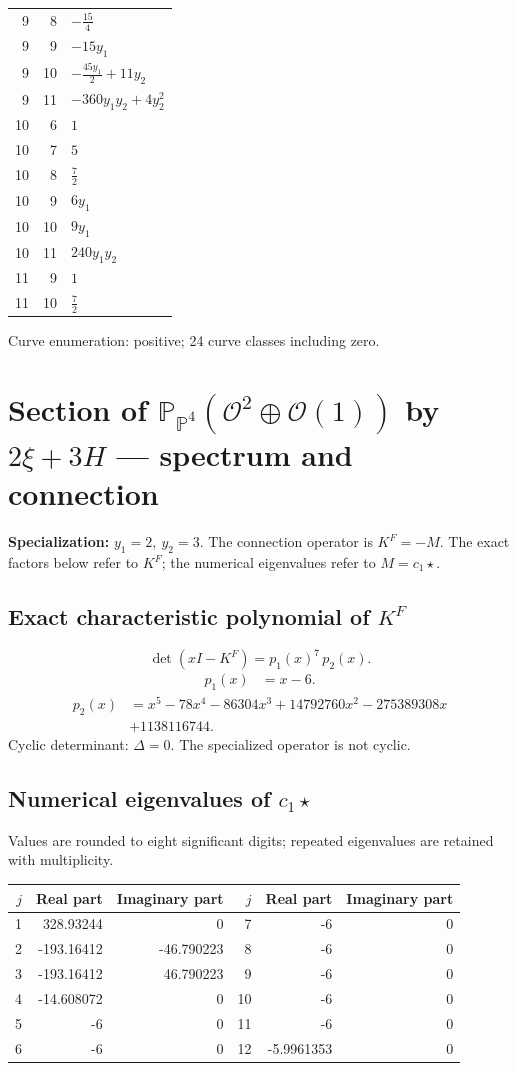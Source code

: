 \documentclass[10pt,a4paper]{article}
\begin{document}
{\begin{longtable}{rrp{125mm}}
9 & 8 & $- \frac{15}{4}$\\
9 & 9 & $- 15 y_{1}$\\
9 & 10 & $- \frac{45 y_{1}}{2} + 11 y_{2}$\\
9 & 11 & $- 360 y_{1} y_{2} + 4 y_{2}^{2}$\\
10 & 6 & $1$\\
10 & 7 & $5$\\
10 & 8 & $\frac{7}{2}$\\
10 & 9 & $6 y_{1}$\\
10 & 10 & $9 y_{1}$\\
10 & 11 & $240 y_{1} y_{2}$\\
11 & 9 & $1$\\
11 & 10 & $\frac{7}{2}$\\
\end{longtable}}
Curve enumeration: positive; 24 curve classes including zero.
\clearpage\section*{Section of $\mathbb P_{\mathbb P^{4}}(\mathcal O^{2}\oplus \mathcal O(1))$ by $2\xi +3H$ --- spectrum and connection}
\textbf{Specialization:} $y_1=2,\ y_2=3$. The connection operator is $K^F=-M$. The exact factors below refer to $K^F$; the numerical eigenvalues refer to $M=c_1\star$.
\subsection*{Exact characteristic polynomial of $K^F$}
\[\det(xI-K^F)=p_{1}(x)^{7}\,p_{2}(x).\]
\[\begin{aligned}p_{1}(x)&=x - 6.\end{aligned}\]
\[\begin{aligned}p_{2}(x)&=x^{5} - 78 x^{4} - 86304 x^{3} + 14792760 x^{2} - 275389308 x\\&+1138116744.\end{aligned}\]
Cyclic determinant: $\Delta=0$. The specialized operator is not cyclic.
\subsection*{Numerical eigenvalues of $c_1\star$}
Values are rounded to eight significant digits; repeated eigenvalues are retained with multiplicity.
\begin{center}\small\begin{tabular}{rrr@{\qquad}rrr}\toprule $j$ & Real part & Imaginary part & $j$ & Real part & Imaginary part\\\midrule
1 & 328.93244 & 0 & 7 & -6 & 0\\
2 & -193.16412 & -46.790223 & 8 & -6 & 0\\
3 & -193.16412 & 46.790223 & 9 & -6 & 0\\
4 & -14.608072 & 0 & 10 & -6 & 0\\
5 & -6 & 0 & 11 & -6 & 0\\
6 & -6 & 0 & 12 & -5.9961353 & 0\\
\bottomrule\end{tabular}\end{center}
\end{document}
